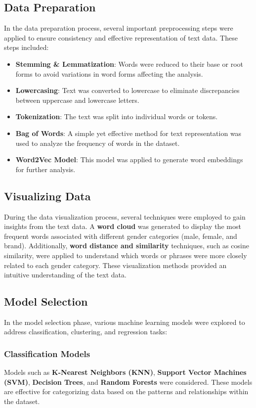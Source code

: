 \documentclass[a4paper,11pt]{article}
\begin{document}
\subsection{Data Preparation}
In the data preparation process, several important preprocessing steps were applied to ensure consistency and effective representation of text data. These steps included:
\begin{itemize}
    \item \textbf{Stemming \& Lemmatization}: Words were reduced to their base or root forms to avoid variations in word forms affecting the analysis.
    \item \textbf{Lowercasing}: Text was converted to lowercase to eliminate discrepancies between uppercase and lowercase letters.
    \item \textbf{Tokenization}: The text was split into individual words or tokens.
    \item \textbf{Bag of Words}: A simple yet effective method for text representation was used to analyze the frequency of words in the dataset.
    \item \textbf{Word2Vec Model}: This model was applied to generate word embeddings for further analysis.
\end{itemize}

\subsection{Visualizing Data}
During the data visualization process, several techniques were employed to gain insights from the text data. A \textbf{word cloud} was generated to display the most frequent words associated with different gender categories (male, female, and brand). Additionally, \textbf{word distance and similarity} techniques, such as cosine similarity, were applied to understand which words or phrases were more closely related to each gender category. These visualization methods provided an intuitive understanding of the text data.

\subsection{Model Selection}
In the model selection phase, various machine learning models were explored to address classification, clustering, and regression tasks:

\subsubsection*{Classification Models}
Models such as \textbf{K-Nearest Neighbors (KNN)}, \textbf{Support Vector Machines (SVM)}, \textbf{Decision Trees}, and \textbf{Random Forests} were considered. These models are effective for categorizing data based on the patterns and relationships within the dataset.
\end{document}

